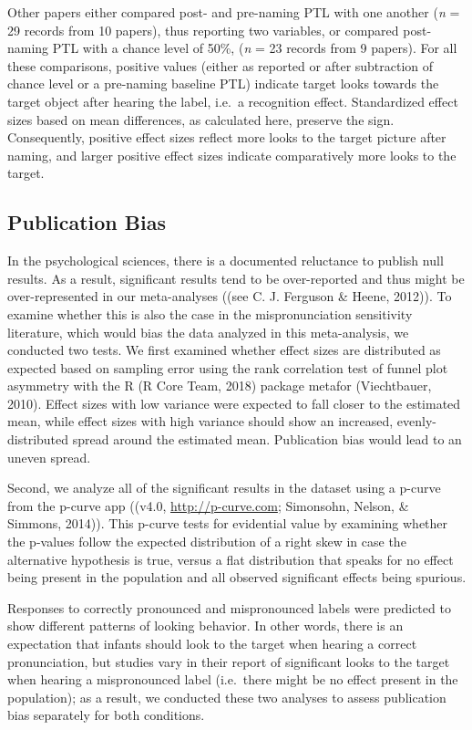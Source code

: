 \documentclass[man]{apa6}
\theoremstyle{definition}
\theoremstyle{definition}
\theoremstyle{definition}
\theoremstyle{remark}
\begin{document}
Other papers either compared post- and pre-naming PTL with one another
(\emph{n} = 29 records from 10 papers), thus reporting two variables, or
compared post-naming PTL with a chance level of 50\%, (\emph{n} = 23
records from 9 papers). For all these comparisons, positive values
(either as reported or after subtraction of chance level or a pre-naming
baseline PTL) indicate target looks towards the target object after
hearing the label, i.e.~a recognition effect. Standardized effect sizes
based on mean differences, as calculated here, preserve the sign.
Consequently, positive effect sizes reflect more looks to the target
picture after naming, and larger positive effect sizes indicate
comparatively more looks to the target.

\subsection{Publication Bias}\label{publication-bias}

In the psychological sciences, there is a documented reluctance to
publish null results. As a result, significant results tend to be
over-reported and thus might be over-represented in our meta-analyses
((see C. J. Ferguson \& Heene, 2012)). To examine whether this is also
the case in the mispronunciation sensitivity literature, which would
bias the data analyzed in this meta-analysis, we conducted two tests. We
first examined whether effect sizes are distributed as expected based on
sampling error using the rank correlation test of funnel plot asymmetry
with the R (R Core Team, 2018) package metafor (Viechtbauer, 2010).
Effect sizes with low variance were expected to fall closer to the
estimated mean, while effect sizes with high variance should show an
increased, evenly-distributed spread around the estimated mean.
Publication bias would lead to an uneven spread.

Second, we analyze all of the significant results in the dataset using a
p-curve from the p-curve app ((v4.0, \url{http://p-curve.com};
Simonsohn, Nelson, \& Simmons, 2014)). This p-curve tests for evidential
value by examining whether the p-values follow the expected distribution
of a right skew in case the alternative hypothesis is true, versus a
flat distribution that speaks for no effect being present in the
population and all observed significant effects being spurious.

Responses to correctly pronounced and mispronounced labels were
predicted to show different patterns of looking behavior. In other
words, there is an expectation that infants should look to the target
when hearing a correct pronunciation, but studies vary in their report
of significant looks to the target when hearing a mispronounced label
(i.e.~there might be no effect present in the population); as a result,
we conducted these two analyses to assess publication bias separately
for both conditions.
\end{document}
